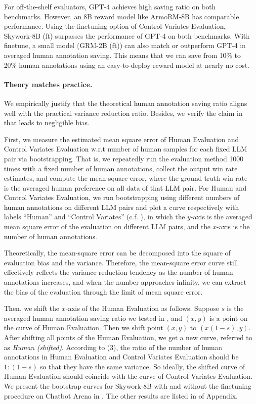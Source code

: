 For off-the-shelf evaluators, GPT-4 achieves high saving ratio on both benchmarks. However, an 8B reward model like ArmoRM-8B has comparable performance. Using the finetuning option of Control Variates Evaluation,  Skywork-8B (ft) surpasses the performance of GPT-4 on both benchmarks. With finetune, a small model (GRM-2B (ft)) can also match or outperform GPT-4 in averaged human annotation saving. This means that we can save from 10\% to 20\% human annotations using an easy-to-deploy reward model at nearly no cost.

\paragraph{Theory matches practice.}
We empirically justify that the theoretical human annotation saving ratio aligns well with the practical variance reduction ratio. Besides, we verify the claim in \citep[Chapter 8.9]{mcbook} that  leads to negligible bias.
\loose

First, we measure the estimated mean square error of Human Evaluation and Control Variates Evaluation w.r.t number of human samples for each fixed LLM pair via bootstrapping.  
That is, we repeatedly run the evaluation method 1000 times with a fixed number of human annotations, collect the output win rate estimates, and compute the mean-square error, where the ground truth win-rate is the averaged human preference on all data of that LLM pair. For Human and Control Variates Evaluation, we run bootstrapping using different numbers of human annotations on different LLM pairs and plot a curve respectively with labels ``Human'' and ``Control Variates'' (c.f. ), in which the $y$-axis is the averaged mean square error of the evaluation on different LLM pairs, and the $x$-axis is the number of human annotations. 

Theoretically, the mean-square error can be decomposed into the square of evaluation bias and the variance. Therefore, the mean-square error curve still effectively reflects the variance reduction tendency as the number of human annotations increases, and when the number approaches infinity, we can extract the bias of the evaluation through the limit of mean square error.

Then, we shift the $x$-axis of the Human Evaluation as follows. Suppose $s$ is the averaged human annotation saving ratio we tested in , and $(x,y)$ is a point on the curve of Human Evaluation. Then we shift point $(x,y)$ to $(x (1-s), y)$. After shifting all points of the Human Evaluation, we get a new curve, referred to as \emph{Human (shifted)}. According to  (3), the ratio of the number of human annotations in Human Evaluation and Control Variates Evaluation should be $1:(1-s)$ so that they have the same variance. So ideally, the shifted curve of Human Evaluation should coincide with the curve of Control Variates Evaluation. We present the bootstrap curves for Skywork-8B with and without the finetuning procedure on Chatbot Arena in . The other results are listed in  of Appendix. 

